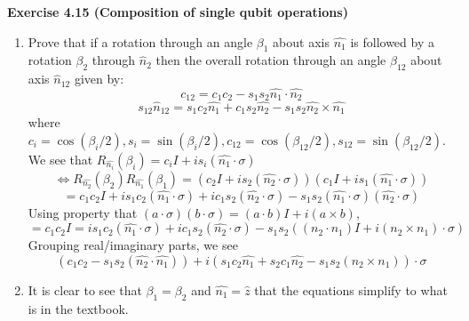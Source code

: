 \documentclass{article}
\begin{document}
\begin{tcolorbox}\textbf{Exercise 4.15 (Composition of single qubit operations)} \begin{enumerate}
	\item Prove that if a rotation through an angle $\beta_1$ about axis $\hat{n_1}$ is followed by a rotation $\beta_2$ through $\hat{n}_2$ then the overall rotation through an angle $\beta_{12}$ about axis $\hat{n}_{12}$ given by:
		$$c_{12} = c_1 c_2 - s_1 s_2 \hat{n_1} \cdot \hat{n_2}$$
	$$s_{12} \hat{n}_{12} = s_1c_2 \hat{n_1} + c_1 s_2 \hat{n_2} - s_1 s_2 \hat{n_2} \times \hat{n_1}$$
	where $c_i = \cos (\beta_i/2), s_i = \sin(\beta_i/2), c_{12} = \cos(\beta_{12}/2), s_{12} = \sin(\beta_{12}/2)$.\\
	We see that $R_{\hat{n_i}}(\beta_i) = c_i I + i s_i (\hat{n_1} \cdot \sigma)$
	$$\iff R_{\hat{n_2}}(\beta_2) R_{\hat{n_1}}(\beta_1) = (c_2 I + is_2(\hat{n_2} \cdot \sigma))(c_1 I + is_1(\hat{n_1} \cdot \sigma))$$
	$$ = c_1c_2 I + i s_1c_2 (\hat{n_1} \cdot \sigma) + i c_1s_2 (\hat{n_2} \cdot \sigma) - s_1s_2 (\hat{n_1} \cdot \sigma)(\hat{n_2} \cdot \sigma)$$
	Using property that $(a \cdot \sigma)(b\cdot \sigma) = (a \cdot b)I + i (a \times b)$,
	$$ = c_1c_2 I = is_1c_2 (\hat{n_1} \cdot \sigma) + i c_1s_2 (\hat{n_2} \cdot \sigma) - s_1s_2 ((n_2 \cdot n_1)I + i(n_2 \times n_1) \cdot \sigma)$$
	Grouping real/imaginary parts, we see
	$$(c_1c_2 - s_1s_2 (\hat{n_2} \cdot \hat{n_1})) + i(s_1c_2 \hat{n_1} + s_2c_1 \hat{n_2} - s_1s_2 (n_2 \times n_1)) \cdot \sigma$$
\item It is clear to see that $\beta_1 = \beta_2$ and $\hat{n_1} = \hat{z}$ that the equations simplify to what is in the textbook.
\end{enumerate}
\end{tcolorbox}
\end{document}
